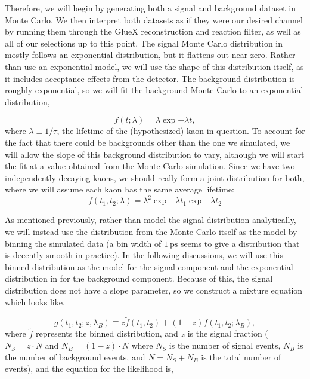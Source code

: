 Therefore, we will begin by generating both a signal and background dataset in Monte Carlo. We then interpret both datasets as if they were our desired channel by running them through the GlueX reconstruction and reaction filter, as well as all of our selections up to this point. The signal Monte Carlo distribution in  mostly follows an exponential distribution, but it flattens out near zero. Rather than use an exponential model, we will use the shape of this distribution itself, as it includes acceptance effects from the detector. The background distribution is roughly exponential, so we will fit the background Monte Carlo to an exponential distribution,

\begin{equation}
  f(t; \lambda) = \lambda \exp{-\lambda t},
  \label{eq:splot-exponential}
\end{equation}
where $\lambda \equiv 1/\tau$, the lifetime of the (hypothesized) kaon in question. To account for the fact that there could be backgrounds other than the one we simulated, we will allow the slope of this background distribution to vary, although we will start the fit at a value obtained from the Monte Carlo simulation. Since we have two independently decaying kaons, we should really form a joint distribution for both, where we will assume each kaon has the same average lifetime:
\begin{equation}
  f(t_1, t_2; \lambda) = \lambda^2 \exp{-\lambda t_1}\exp{-\lambda t_2}
  \label{eq:splot-exponential_joint}
\end{equation}

As mentioned previously, rather than model the signal distribution analytically, we will instead use the distribution from the Monte Carlo itself as the model by binning the simulated data (a bin width of $\SI{1}{\pico\second}$ seems to give a distribution that is decently smooth in practice). In the following discussions, we will use this binned distribution as the model for the signal component and the exponential distribution in  for the background component. Because of this, the signal distribution does not have a slope parameter, so we construct a mixture equation which looks like,

\begin{equation}
  g(t_1, t_2; z, \lambda_B) \equiv z \tilde{f}(t_1, t_2) + (1-z) f(t_1, t_2; \lambda_B),
  \label{eq:splot-mixture}
\end{equation}
where $\tilde{f}$ represents the binned distribution, and $z$ is the signal fraction ($N_S = z\cdot N$ and $N_B = (1-z)\cdot N$ where $N_S$ is the number of signal events, $N_B$ is the number of background events, and $N = N_S + N_B$ is the total number of events), and the equation for the likelihood is,

